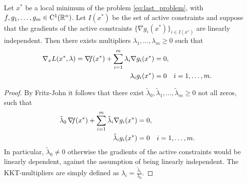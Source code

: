 \documentclass[10pt,a4paper]{article}
\begin{document}
\begin{theorem}
	Let $x^*$ be a local minimum of the problem \eqref{eq:last_problem}, with $f, g_1,\dots, g_m\in \mathord{\mathrm{C^1}}(\mathbb{R}^n)$. Let $I(x^*)$ be the set of active constraints and suppose that the gradients of the active constraints $\{\nabla g_i(x^*)\}_{i\in I(x^*)}$ are linearly independent. Then there exists multipliers $\lambda_1, \dots, \lambda_m\geq 0$ such that 
	\begin{equation}\label{eq:kkt}
		\begin{split}
			\nabla_x L(x^*,\lambda) = \operatorname*{\mathit{\nabla \!f}}(x^*)+ \sum_{i=1}^{m} \lambda_i \nabla g_i(x^*) &= 0,\\
			\lambda_ig_i(x^*)&=0 \quad i=1, \dots, m.
		\end{split}
	\end{equation}
\end{theorem}
\begin{proof}
	By Fritz-John it follows that there exist $\tilde{\lambda}_0, \tilde{\lambda}_1, \dots, \tilde{\lambda}_m\geq 0$ not all zeros, such that \begin{equation*}
		\begin{split}
			\tilde{\lambda}_0\operatorname*{\mathit{\nabla \!f}}(x^*)+ \sum_{i=1}^{m} \tilde{\lambda}_i \nabla g_i(x^*) &= 0,\\
			\tilde{\lambda}_ig_i(x^*)&=0 \quad i=1, \dots, m.
		\end{split}
	\end{equation*}
In particular, $\tilde{\lambda}_0\neq0$ otherwise the gradients of the active constraints would be linearly dependent, against the assumption of being linearly independent. The KKT-multipliers are simply defined as $\lambda_i=\frac{\tilde{\lambda}_i}{\lambda_0}$.
\end{proof}
\end{document}
